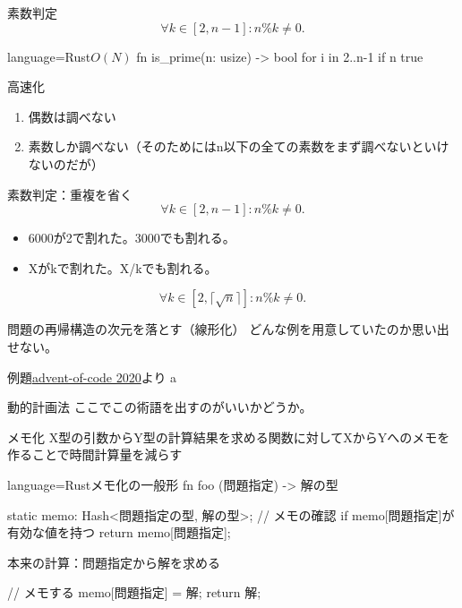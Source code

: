 \documentclass{beamer}
\begin{document}
\begin{frame}[fragile]{素数判定}{}
\[
\forall k \in [2, n-1] : n \% k \ne 0.
\]

\begin{codeof}{language=Rust}{$O(N)$}
fn is_prime(n: usize) -> bool {
    for i in 2..n-1 {
        if n %
    }
    true
}
\end{codeof}
高速化
\begin{enumerate}%
\item 偶数は調べない
\item 素数しか調べない（そのためにはn以下の全ての素数をまず調べないといけないのだが）
\end{enumerate}
\end{frame}

\begin{frame}[fragile]{素数判定：重複を省く}{}
\[
\forall k \in [2, n-1] : n \% k \ne 0.
\]

\begin{itemize}%
\item 6000が2で割れた。3000でも割れる。
\item Xがkで割れた。X/kでも割れる。
\end{itemize}

\[
\forall k \in [2, \lceil\sqrt{n}\rceil] : n \% k \ne 0.
\]

\end{frame}

\begin{frame}[fragile]{問題の再帰構造の次元を落とす（線形化）}{}
どんな例を用意していたのか思い出せない。
\end{frame}

\begin{frame}[fragile]{例題}{\href{}{advent-of-code 2020}より}
a
\end{frame}

\begin{frame}[fragile]{動的計画法}{}
ここでこの術語を出すのがいいかどうか。
\end{frame}

\begin{frame}[fragile]{メモ化}{\href{https://ja.wikipedia.org/wiki/メモ化}{}}
X型の引数からY型の計算結果を求める関数に対してXからYへのメモを作ることで時間計算量を減らす
\begin{codeof}{language=Rust}{メモ化の一般形}
fn foo (問題指定) -> 解の型 {
  static memo: Hash<問題指定の型, 解の型>;
  // メモの確認
  if memo[問題指定]が有効な値を持つ {
    return memo[問題指定];
  }

   本来の計算：問題指定から解を求める

  // メモする
  memo[問題指定] = 解;
  return 解;
}
\end{codeof}

\end{frame}
\end{document}
